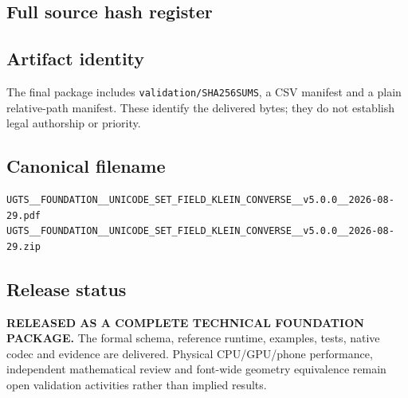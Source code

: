 \documentclass[11pt,a4paper]{article}
\newcommand{\status}[1]{\textbf{\textcolor{UGTSTeal}{#1}}}
\begin{document}
\subsection{Full source hash register}

\subsection{Artifact identity}
The final package includes \texttt{validation/SHA256SUMS}, a CSV manifest and a plain relative-path manifest. These identify the delivered bytes; they do not establish legal authorship or priority.

\subsection{Canonical filename}
\begin{Verbatim}[fontsize=\small,frame=single]
UGTS__FOUNDATION__UNICODE_SET_FIELD_KLEIN_CONVERSE__v5.0.0__2026-08-29.pdf
UGTS__FOUNDATION__UNICODE_SET_FIELD_KLEIN_CONVERSE__v5.0.0__2026-08-29.zip
\end{Verbatim}

\subsection{Release status}
\status{RELEASED AS A COMPLETE TECHNICAL FOUNDATION PACKAGE.} The formal schema, reference runtime, examples, tests, native codec and evidence are delivered. Physical CPU/GPU/phone performance, independent mathematical review and font-wide geometry equivalence remain open validation activities rather than implied results.
\end{document}

